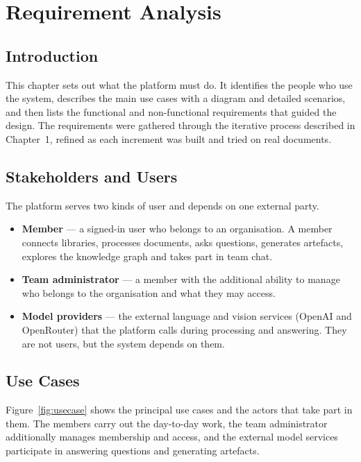 \chapter{Requirement Analysis}
\label{ch:requirements}

\section{Introduction}

This chapter sets out what the platform must do. It identifies the people who use
the system, describes the main use cases with a diagram and detailed scenarios,
and then lists the functional and non-functional requirements that guided the
design. The requirements were gathered through the iterative process described in
Chapter~1, refined as each increment was built and tried on real documents.

\section{Stakeholders and Users}

The platform serves two kinds of user and depends on one external party.

\begin{itemize}[leftmargin=*,itemsep=2pt]
  \item \textbf{Member} — a signed-in user who belongs to an organisation. A
        member connects libraries, processes documents, asks questions, generates
        artefacts, explores the knowledge graph and takes part in team chat.
  \item \textbf{Team administrator} — a member with the additional ability to
        manage who belongs to the organisation and what they may access.
  \item \textbf{Model providers} — the external language and vision services
        (OpenAI and OpenRouter) that the platform calls during processing and
        answering. They are not users, but the system depends on them.
\end{itemize}

\section{Use Cases}

Figure~\ref{fig:usecase} shows the principal use cases and the actors that take
part in them. The members carry out the day-to-day work, the team administrator
additionally manages membership and access, and the external model services
participate in answering questions and generating artefacts.

